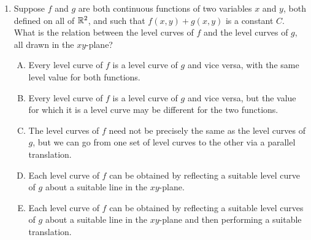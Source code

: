 \documentclass[10pt]{amsart}
\begin{document}
\begin{enumerate}
  \begin{enumerate}[(A)]
  \item Each level curve is a single line.
  \item Each level curve is a union of two intersecting lines.
  \item Each level curve is a union of two distinct parallel lines.
  \item Each level curve is a union of infinitely many concurrent
    lines (i.e., infinitely many lines, all passing through the same
    point).
  \item Each level curve is a union of infinitely many distinct
    parallel lines (i.e., infinitely many lines, all parallel to each
    other).
  \end{enumerate}

  {\em Answer}: Option (E)

  {\em Explanation}: For $C \in [-1,1]$, we need to solve $\sin(x + y)
  = C$. We first find all solutions $u$ to $\sin u = C$, which is a
  countably infinite subset of $\R$. Then, for each such $u$, we get
  the line $x + y = u$ in the $xy$-plane. All these lines are parallel
  to each other, and have slope $-1$.

  {\em Performance review}: $15$ out of $26$ got this. $6$ chose (A),
  $4$ chose (D), $1$ chose (B).

\item Suppose $f$ and $g$ are both continuous functions of two
  variables $x$ and $y$, both defined on all of $\mathbb{R}^2$, and such that
  $f(x,y) + g(x,y)$ is a constant $C$. What is the relation between
  the level curves of $f$ and the level curves of $g$, all drawn in
  the $xy$-plane?

  \begin{enumerate}[(A)]
  \item Every level curve of $f$ is a level curve of $g$ and vice
    versa, with the same level value for both functions.
  \item Every level curve of $f$ is a level curve of $g$ and vice
    versa, but the value for which it is a level curve may be different
    for the two functions.
  \item The level curves of $f$ need not be precisely the same as the
    level curves of $g$, but we can go from one set of level curves to
    the other via a parallel translation.
  \item Each level curve of $f$ can be obtained by reflecting a
    suitable level curve of $g$ about a suitable line in the
    $xy$-plane.
  \item Each level curve of $f$ can be obtained by reflecting a
    suitable level curves of $g$ about a suitable line in the
    $xy$-plane and then performing a suitable translation.
  \end{enumerate}


\end{enumerate}
\end{document}
